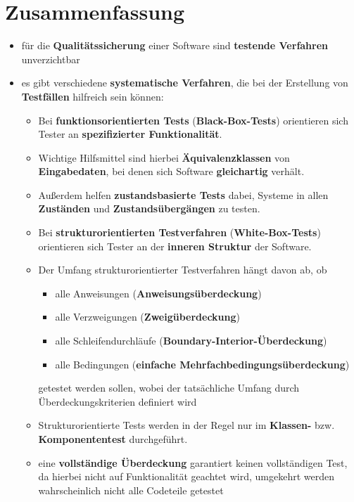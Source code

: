 \section{Zusammenfassung}

\begin{itemize}
    \item für die \textbf{Qualitätssicherung} einer Software sind \textbf{testende Verfahren} unverzichtbar
    \item es gibt verschiedene \textbf{systematische Verfahren}, die bei der Erstellung von \textbf{Testfällen} hilfreich sein können:
    \begin{itemize}
        \item Bei \textbf{funktionsorientierten Tests} (\textbf{Black-Box-Tests}) orientieren sich Tester an \textbf{spezifizierter Funktionalität}.
        \item[] Wichtige Hilfsmittel sind hierbei \textbf{Äquivalenzklassen} von \textbf{Eingabedaten}, bei denen sich Software \textbf{gleichartig} verhält.
        \item[] Außerdem helfen \textbf{zustandsbasierte Tests} dabei, Systeme in allen \textbf{Zuständen} und \textbf{Zustandsübergängen} zu testen.
        \item Bei \textbf{strukturorientierten Testverfahren} (\textbf{White-Box-Tests}) orientieren sich Tester an der \textbf{inneren Struktur} der Software.
        \item[] Der Umfang strukturorientierter Testverfahren hängt davon ab, ob
        \begin{itemize}
            \item alle Anweisungen (\textbf{Anweisungsüberdeckung})
            \item alle Verzweigungen (\textbf{Zweigüberdeckung})
            \item alle Schleifendurchläufe (\textbf{Boundary-Interior-Überdeckung})
            \item alle Bedingungen (\textbf{einfache Mehrfachbedingungsüberdeckung})
        \end{itemize}
        \noindent getestet werden sollen, wobei der tatsächliche Umfang durch Überdeckungskriterien  definiert wird
        \item[] Strukturorientierte Tests werden in der Regel nur im \textbf{Klassen-} bzw. \textbf{Komponententest} durchgeführt.
        \item eine \textbf{vollständige Überdeckung} garantiert keinen vollständigen Test, da hierbei nicht auf Funktionalität geachtet wird, umgekehrt werden wahrscheinlich nicht alle Codeteile getestet

\end{itemize}
\end{itemize}
